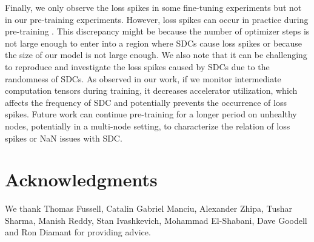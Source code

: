 Finally, we only observe the loss spikes in some fine-tuning experiments but not in our pre-training experiments. However, loss spikes can occur in practice during pre-training  \cite{chowdhery2023palm}. This discrepancy might be because the number of optimizer steps is not large enough to enter into a region where SDCs cause loss spikes or because the size of our model is not large enough. We also note that it can be challenging to reproduce and investigate the loss spikes caused by SDCs due to the randomness of SDCs. As observed in our work, if we monitor intermediate computation tensors during training, it decreases accelerator utilization, which affects the frequency of SDC and potentially prevents the occurrence of loss spikes. Future work can continue pre-training for a longer period on unhealthy nodes, potentially in a multi-node setting, to characterize the relation of loss spikes or NaN issues with SDC.

\section*{Acknowledgments}
We thank Thomas Fussell, Catalin Gabriel Manciu, Alexander Zhipa, Tushar Sharma, Manish Reddy, Stan Ivashkevich, Mohammad El-Shabani, Dave Goodell and Ron Diamant for providing advice.
